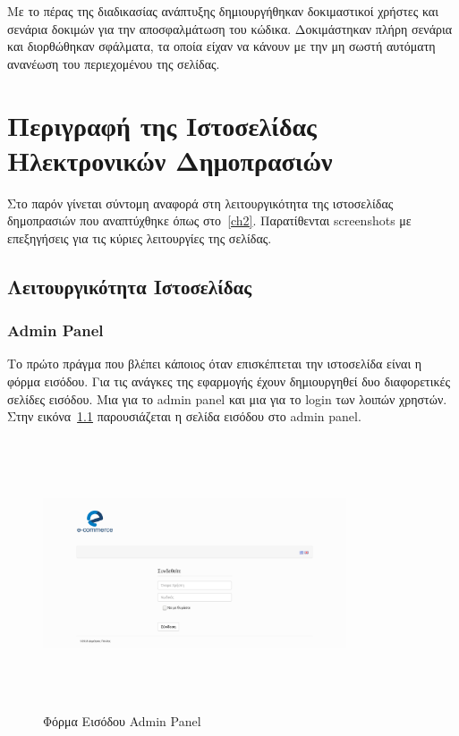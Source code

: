\documentclass[12pt]{report}
\begin{document}
Με το πέρας της διαδικασίας ανάπτυξης δημιουργήθηκαν δοκιμαστικοί χρήστες και σενάρια δοκιμών για την αποσφαλμάτωση του κώδικα. Δοκιμάστηκαν πλήρη σενάρια και διορθώθηκαν σφάλματα, τα οποία είχαν να κάνουν με την μη σωστή αυτόματη ανανέωση του περιεχομένου της σελίδας.

\chapter{Περιγραφή της Ιστοσελίδας Ηλεκτρονικών Δημοπρασιών}\label{ch3}
Στο παρόν γίνεται σύντομη αναφορά στη λειτουργικότητα της ιστοσελίδας δημοπρασιών που αναπτύχθηκε όπως στο~\ref{ch2}. Παρατίθενται \textlatin{screenshots} με επεξηγήσεις για τις κύριες λειτουργίες της σελίδας.

\section{Λειτουργικότητα Ιστοσελίδας}
\subsection{\textlatin{Admin Panel}}
Το πρώτο πράγμα που βλέπει κάποιος όταν επισκέπτεται την ιστοσελίδα είναι η φόρμα εισόδου. Για τις ανάγκες της εφαρμογής έχουν δημιουργηθεί δυο διαφορετικές σελίδες εισόδου. Μια για το \textlatin{admin panel} και μια για το \textlatin{login} των λοιπών χρηστών. Στην εικόνα~\ref{fig:login_1} παρουσιάζεται η σελίδα εισόδου στο \textlatin{admin panel}.
\begin{figure}[H]
\centering
\includegraphics[width=0.8\textwidth, height=8cm]{Screenshot-2018-1-14-login-e-auctions}
\caption{Φόρμα Εισόδου \textlatin{Admin Panel}}
\label{fig:login_1}
\end{figure}
\end{document}
